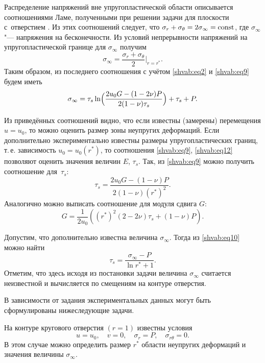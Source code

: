 Распределение напряжений вне упругопластической области описывается соотношениями Ламе, полученными при решении задачи для плоскости с~отверстием \cite{shvab:bib5}. 
Из этих соотношений следует, что $\sigma _r+\sigma _\theta = 2\sigma _\infty = \rm const$, где $\sigma _\infty$ "--- напряжения на бесконечности. 
Из условий непрерывности напряжений на упругопластической границе для $\sigma _\infty $ получим
\[
\sigma _\infty =\frac{\sigma _r +\sigma _\theta }{2}\Big|_{r=r^\ast}.
\]
Таким образом, из последнего соотношения с учётом \eqref{shvab:eq2} и \eqref{shvab:eq9} будем иметь
\begin{equation}
\label{shvab:eq10}
\sigma _\infty =\tau _s \ln \Bigl( \frac{2u_0 G- (1-2\nu)P }{2 (1-\nu)\tau _s}\Bigr)+\tau _s +P.
\end{equation}

Из приведённых соотношений видно, что если известны (замерены) перемещения \mbox{$u=u_0 $,} то можно оценить размер зоны неупругих деформаций. 
Если дополнительно экспериментально известны размеры упругопластических границ, т.\,е. зависимость $u_0 =u_0 (r^\ast)$, то соотношения \eqref{shvab:eq9}, \eqref{shvab:eq12} позволяют оценить значения величин $E$, $\tau _s$. 
Так, из \eqref{shvab:eq9} можно  получить соотношение для~$\tau _s $:
\begin{equation}
\label{shvab:eq11}
\tau _s =\frac{2u_0 G-(1-\nu )P}{2(1-\nu )(r^\ast )^2}.
\end{equation}
Аналогично можно выписать соотношение для модуля сдвига $G$:
\begin{equation}
\label{shvab:eq12}
G=\frac{1}{2u_0 }\left( (r^\ast)^2(2-2\nu )\tau _s +(1-\nu )P \right).
\end{equation}

Допустим, что дополнительно известна величина $\sigma _\infty $. Тогда из \eqref{shvab:eq10} можно найти
\begin{equation}
\label{shvab:eq13}
\tau _s =\frac{\sigma _\infty -P}{\ln r^\ast +1}.
\end{equation}
Отметим, что здесь исходя из постановки задачи величина $\sigma _\infty $
считается неизвестной и вычисляется по смещениям на контуре отверстия.

В зависимости от задания экспериментальных данных могут быть сформулированы
нижеследующие задачи.

\begin{task}[1]На контуре кругового отверстия $(r=1)$ известны условия 
\begin{equation}
\label{shvab:eq1'}
u=u_0, \quad v =0, \quad  \sigma _r =P, \quad \sigma _{r\theta } =0.
\end{equation}
В этом случае можно определить  размер $r^\ast$ области неупругих деформаций  и значения величины $\sigma _\infty .$
\end{task}

